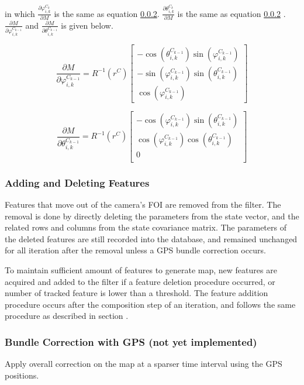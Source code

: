 \noindent in which $\frac{\partial \varphi _{i, k}^{C_{k}}}{\partial
  M}$ is the same as equation \ref{}. $\frac{\partial \theta _{i,
    k}^{C_{k}}}{\partial M}$ is the same as equation \ref{} . $\frac{\partial
  M}{\partial \varphi _{i,k}^{C_{k-1}}}$ and $ \frac{\partial
  M}{\partial \theta _{i, k}^{C_{k-1}}}$ is given below.

\begin{equation}
\frac{\partial M}{\partial \varphi_{i,k}^{C_{k-1}}}=
R^{-1}(r^{C})\begin{bmatrix}
-\cos(\theta_{i, k}^{C_{k-1}})\sin(\varphi_{i,k}^{C_{k-1}}) \\
-\sin(\varphi_{i,k}^{C_{k-1}})\sin(\theta_{i, k}^{C_{k-1}}) \\
\cos (\varphi_{i,k}^{C_{k-1}})
\end{bmatrix}
\end{equation}

\begin{equation}
\frac{\partial M}{\partial \theta _{i,k}^{C_{k-1}}}=
R^{-1}(r^{C}) \begin{bmatrix}
-\cos(\varphi_{i,k}^{C_{k-1}})\sin(\theta_{i, k}^{C_{k-1}})\\
\cos(\varphi_{i,k}^{C_{k-1}})\cos(\theta_{i, k}^{C_{k-1}})\\
0\\
\end{bmatrix}
\end{equation}

\subsubsection{Adding and Deleting Features}\label{section:_Toc332876136}
Features that move out of the camera's FOI are removed from the filter. 
The removal is done by directly deleting the parameters from the state 
vector, and the related rows and columns from the state covariance 
matrix. The parameters of the deleted features are still recorded into 
the database, and remained unchanged for all iteration after the removal 
unless a GPS bundle correction occurs. 

To maintain sufficient amount of features to generate map, new features 
are acquired and added to the filter if a feature deletion procedure 
occurred, or number of tracked feature is lower than a threshold. The 
feature addition procedure occurs after the composition step of an 
iteration, and follows the same procedure as described in section . 

\subsubsection{Bundle Correction with GPS (not yet implemented)}
Apply overall correction on the map at a sparser time interval using the 
GPS positions. 

